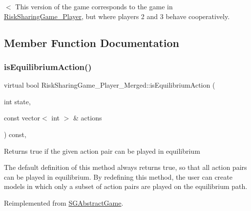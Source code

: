 $<$ This version of the game corresponds to the game in \hyperlink{classRiskSharingGame__3Player}{Risk\+Sharing\+Game\+\_\+Player}, but where players 2 and 3 behave cooperatively. 

\subsection{Member Function Documentation}
\mbox{\label{classRiskSharingGame__3Player__Merged_aeff4f08e00ef46bbdbb190c9c6c393a4}} 
\subsubsection{\texorpdfstring{is\+Equilibrium\+Action()}{isEquilibriumAction()}}
{\footnotesize\ttfamily virtual bool Risk\+Sharing\+Game\+\_\+Player\+\_\+\+Merged\+::is\+Equilibrium\+Action (\begin{DoxyParamCaption}\item[{int}]{state,  }\item[{const vector$<$ int $>$ \&}]{actions }\end{DoxyParamCaption}) const\hspace{0.3cm}{\ttfamily [inline]}, {\ttfamily [virtual]}}

Returns true if the given action pair can be played in equilibrium

The default definition of this method always returns true, so that all action pairs can be played in equilibrium. By redefining this method, the user can create models in which only a subset of action pairs are played on the equilibrium path. 

Reimplemented from \hyperlink{classSGAbstractGame_a2cec8147c3055cfe6314da349d1a7344}{S\+G\+Abstract\+Game}.

\mbox{\label{classRiskSharingGame__3Player__Merged_aa1d807770ff356fe1114d17966172fbd}} 
